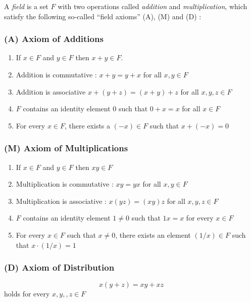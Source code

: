 \begin{defn}
    A {\it field} is a set $F$ with two operations called {\it addition} and {\it multiplication},
    which satisfy the following so-called ``field axioms'' (A), (M) and (D) : 
    \subsubsection{(A) Axiom of Additions}
    \label{add}
    \begin{enumerate}[(\text{A}1)]
        \item If $x \in F$ and $y \in F$ then $x + y \in F$.
        \item Addition is commutative : $x + y = y + x$ for all $x, y \in F$
        \item Addition is associative $x + (y + z) = (x + y) + z$ for all $x, y, z \in F$
        \item $F$ contains an identity element $0$ such that $0 + x = x$ for all $x \in F$
        \item For every $x \in F$, there exists a $(-x) \in F$ such that $x + (-x) = 0$
    \end{enumerate}

    \subsubsection{(M) Axiom of Multiplications}
    \label{mul}
    \begin{enumerate}[(M1)]
        \item If $x \in F$ and $y \in F$ then $xy \in F$ 
        \item Multiplication is commutative : $xy = yx$ for all $x, y \in F$
        \item Multiplication is associative : $x(yz) = (xy)z$ for all $x, y, z \in F$
        \item $F$ contains an identity element $1 \neq 0$ such that $1x = x$ for every $x \in F$
        \item For every $x \in F$ such that $x \neq 0$, there exists an element $(1/x) \in F$ 
        such that $x \cdot (1/x) = 1$
    \end{enumerate}

    \subsubsection{(D) Axiom of Distribution}
    \label{dis}
    $$ x (y + z) = xy + xz $$ holds for every $x, y,, z \in F$
\end{defn}

